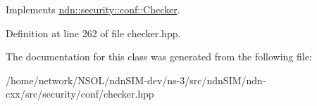 Implements \hyperlink{classndn_1_1security_1_1conf_1_1Checker_ad2b264b924798134a3b1aafee06ad8de}{ndn\+::security\+::conf\+::\+Checker}.



Definition at line 262 of file checker.\+hpp.



The documentation for this class was generated from the following file\+:\begin{DoxyCompactItemize}
\item 
/home/network/\+N\+S\+O\+L/ndn\+S\+I\+M-\/dev/ns-\/3/src/ndn\+S\+I\+M/ndn-\/cxx/src/security/conf/checker.\+hpp\end{DoxyCompactItemize}
